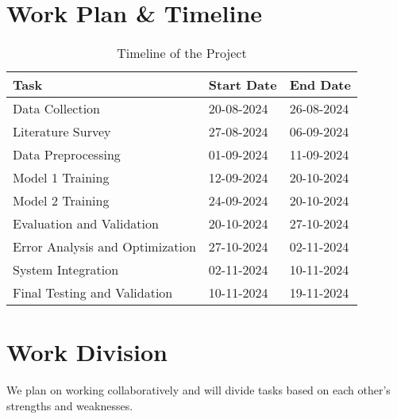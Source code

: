 \documentclass{article}
\begin{document}
\section*{Work Plan \& Timeline}
\begin{table}[h!]
    \centering
    \begin{tabular}{|l|l|l|}
        \hline
        \textbf{Task} & \textbf{Start Date} & \textbf{End Date} \\
        \hline
        Data Collection & 20-08-2024 & 26-08-2024 \\
        Literature Survey & 27-08-2024 & 06-09-2024 \\
        Data Preprocessing & 01-09-2024 & 11-09-2024 \\
        Model 1 Training & 12-09-2024 & 20-10-2024 \\
        Model 2 Training & 24-09-2024 & 20-10-2024 \\
        Evaluation and Validation & 20-10-2024 & 27-10-2024 \\
        Error Analysis and Optimization & 27-10-2024 & 02-11-2024 \\
        System Integration & 02-11-2024 & 10-11-2024 \\
        Final Testing and Validation & 10-11-2024 & 19-11-2024 \\
        \hline
    \end{tabular}
    \caption{Timeline of the Project}
\end{table}

\section*{Work Division}
We plan on working collaboratively and will divide tasks based on each other's strengths and weaknesses.


\nocite{*}%
	

\end{document}
